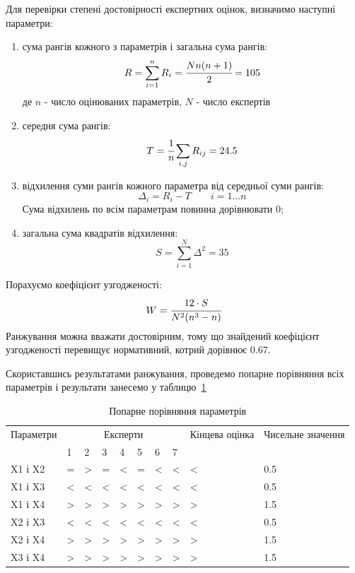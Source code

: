 Для перевірки степені достовірності експертних оцінок, визначимо наступні параметри: 
\begin{enumerate}
	\item сума рангів кожного з параметрів і загальна сума рангів:
	\begin{equation}
		R = \sum\limits_{i=1}^{n} R_i = \cfrac{Nn(n+1)}{2} = 105 
	\end{equation}
	де $n$ - число оцінюваних параметрів, $N$ - число експертів
	
	\item середня сума рангів:
	\begin{equation}
		T = \cfrac 1n \sum\limits_{i,j} R_{ij} = 24.5
	\end{equation}
	
	\item відхилення суми рангів кожного параметра від середньої суми рангів:
	\begin{equation}
		\Delta_i = R_i - T \qquad i=1\ldots n
	\end{equation}
	Сума відхилень по всім параметрам повинна дорівнювати $0$;
	
	\item загальна сума квадратів відхилення:
	\begin{equation}
		S = \sum\limits_{i=1}^{N} \Delta^2 = 35
	\end{equation}
\end{enumerate}

Порахуємо коефіцієнт узгодженості: 
\begin{equation}
	W = \cfrac{12\cdot S}{N^2(n^3-n)}
\end{equation}
Ранжування можна вважати достовірним, тому що знайдений коефіцієнт узгодженості перевищує нормативний, котрий дорівнює $0.67$.

Скориставшись результатами ранжування, проведемо попарне порівняння всіх параметрів і результати занесемо у таблицю~\ref{tab:economics:pair_wise_eval}
\begin{table}
	\caption{Попарне порівняння параметрів}
	\centering
	\begin{tabular}{| p{} | p{} | p{} | p{} | p{} | p{} | p{} | p{} | p{}|p{}|}
	\hline
	Параметри	& \multicolumn{7}{c|}{Експерти} & Кінцева оцінка & Чисельне значення \\
	\cline{2-8}
				& 1 & 2 & 3 & 4 & 5 & 6 & 7		&				& \\
	\hline
	X1 і X2 &=& >& =& <& =& <& <& < & 0.5 \\
	\hline
	X1 і X3 &< &< &< &< &< &< &< &< & 0.5\\
	\hline	
	X1 і X4 &> &> &> &> &> &> &> &> & 1.5\\
	\hline	
	X2 і X3 &< &< &< &< &< &< &< &< & 0.5\\
	\hline	
	X2 і X4 &> &> &> &> &> &> &> &> & 1.5\\
	\hline	
	X3 і X4 &> &> &> &> &> &> &> &>	 & 1.5 \\
	\hline	
	\end{tabular}
	\label{tab:economics:pair_wise_eval}
\end{table}

